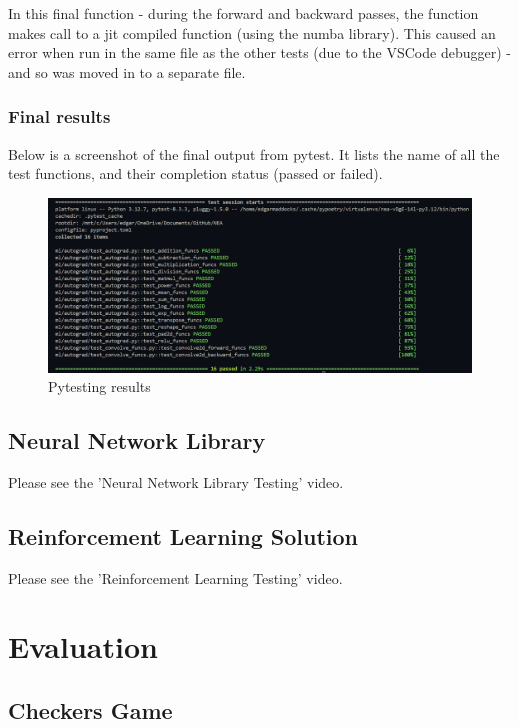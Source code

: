 \documentclass{article}
\begin{document}
    In this final function - during the forward and backward passes, the function makes call to 
    a jit compiled function (using the numba library). This caused an error when run in
    the same file as the other tests (due to the VSCode debugger) - and so was moved in to a separate file.

    \subsubsection{Final results}

    Below is a screenshot of the final output from pytest. It lists the name of all the test functions,
    and their completion status (passed or failed).

    \begin{figure}[h]
        \centering
        \includegraphics[scale=0.5]{passing_tests.png}
        \caption{Pytesting results}
    \end{figure}
     
    \subsection{Neural Network Library}

    Please see the 'Neural Network Library Testing' video.

    \subsection{Reinforcement Learning Solution}

    Please see the 'Reinforcement Learning Testing' video.

    \section{Evaluation}

    \subsection{Checkers Game}
\end{document}
